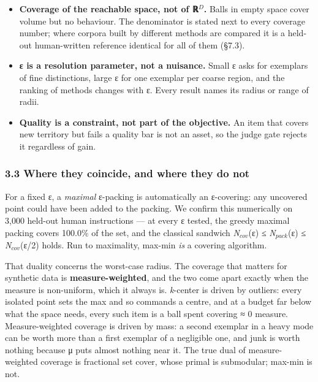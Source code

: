 \documentclass[
  10pt,
]{article}
\providecommand{\tightlist}{%
  \setlength{\itemsep}{0pt}\setlength{\parskip}{0pt}}
\theoremstyle{plain}
\theoremstyle{definition}
\providecommand{\tightlist}{\setlength{\itemsep}{0pt}\setlength{\parskip}{0pt}}
\begin{document}
\begin{itemize}
\tightlist
\item
  \textbf{Coverage of the reachable space, not of ℝ\(^{D}\).} Balls in
  empty space cover volume but no behaviour. The denominator is stated
  next to every coverage number; where corpora built by different
  methods are compared it is a held-out human-written reference
  identical for all of them (§7.3).
\item
  \textbf{ε is a resolution parameter, not a nuisance.} Small ε asks for
  exemplars of fine distinctions, large ε for one exemplar per coarse
  region, and the ranking of methods changes with ε. Every result names
  its radius or range of radii.
\item
  \textbf{Quality is a constraint, not part of the objective.} An item
  that covers new territory but fails a quality bar is not an asset, so
  the judge gate rejects it regardless of gain.
\end{itemize}

\subsubsection{3.3 Where they coincide, and where they do
not}\label{33-where-they-coincide-and-where-they-do-not}

For a fixed ε, a \emph{maximal} ε-packing is automatically an
ε-covering: any uncovered point could have been added to the packing. We
confirm this numerically on 3,000 held-out human instructions --- at
every ε tested, the greedy maximal packing covers 100.0\% of the set,
and the classical sandwich \emph{N}\(_{cov}\)(ε) ≤
\emph{N}\(_{pack}\)(ε) ≤ \emph{N}\(_{cov}\)(ε/2) holds. Run to
maximality, max-min \emph{is} a covering algorithm.

That duality concerns the worst-case radius. The coverage that matters
for synthetic data is \textbf{measure-weighted}, and the two come apart
exactly when the measure is non-uniform, which it always is.
\emph{k}-center is driven by outliers: every isolated point sets the max
and so commands a centre, and at a budget far below what the space
needs, every such item is a ball spent covering ≈ 0 measure.
Measure-weighted coverage is driven by mass: a second exemplar in a
heavy mode can be worth more than a first exemplar of a negligible one,
and junk is worth nothing because μ puts almost nothing near it. The
true dual of measure-weighted coverage is fractional set cover, whose
primal is submodular; max-min is not.
\end{document}
